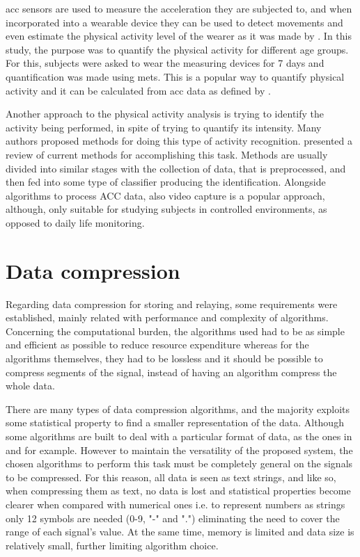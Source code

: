 \ac{acc} sensors are used to measure the acceleration they are subjected to, and when incorporated into a wearable device they can be used to detect movements and even estimate the physical activity level of the wearer as it was made by \citet{b_acc}. In this study, the purpose was to quantify the physical activity for different age groups. For this, subjects were asked to wear the measuring devices for 7 days and quantification was made using \ac{mets}. This is a popular way to quantify physical activity and it can be calculated from \ac{acc} data as defined by \citet{crouter_METS}.

Another approach to the physical activity analysis is trying to identify the activity being performed, in spite of trying to quantify its intensity. Many authors proposed methods for doing this type of activity recognition. \citet{b_acc2} presented a review of current methods for accomplishing this task. Methods are usually divided into similar stages with the collection of data, that is preprocessed, and then fed into some type of classifier producing the identification. Alongside algorithms to process ACC data, also video capture is a popular approach, although, only suitable for studying subjects in controlled environments, as opposed to daily life monitoring. 

\section{Data compression}

Regarding data compression for storing and relaying, some requirements were established, mainly related with performance and complexity of algorithms. Concerning the computational burden, the algorithms used had to be as simple and efficient as possible to reduce resource expenditure whereas for the algorithms themselves, they had to be lossless and it should be possible to compress segments of the signal, instead of having an algorithm compress the whole data.

There are many types of data compression algorithms, and the majority exploits some statistical property to find a smaller representation of the data. Although some algorithms are built to deal with a particular format of data, as the ones in \citet{b_ecg_compression} and \citet{b_ecg_compression_2} for example. However to maintain the versatility of the proposed system, the chosen algorithms to perform this task must be completely general on the signals to be compressed. For this reason, all data is seen as text strings, and like so, when compressing them as text, no data is lost and statistical properties become clearer when compared with numerical ones i.e. to represent numbers as strings only 12 symbols are needed (0-9, "-" and ".") eliminating the need to cover the range of each signal's value. At the same time, memory is limited and data size is relatively small, further limiting algorithm choice.

